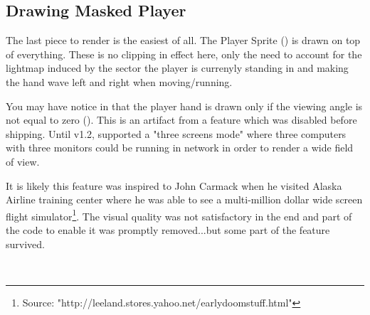 \subsection{Drawing Masked Player}
The last piece to render is the easiest of all. The Player Sprite () is drawn on top of everything. These is no clipping in effect here, only the need to account for the lightmap induced by the sector the player is currenyly standing in and making the hand wave left and right when moving/running.\\
\par
You may have notice in  that the player hand is drawn only if the viewing angle is not equal to zero (). This is an artifact from a feature which was disabled before shipping. Until v1.2, \doom supported a "three screens mode" where three computers with three monitors could be running in network in order to render a wide field of view.\\
\par
{}
\par
It is likely this feature was inspired to John Carmack when he visited Alaska Airline training center where he was able to see a multi-million dollar wide screen flight simulator\footnote{Source: "http://leeland.stores.yahoo.net/earlydoomstuff.html"}. The visual quality was not satisfactory in the end and part of the code to enable it was promptly removed...but some part of the feature survived.\\
\par
{}\\

\pagebreak
